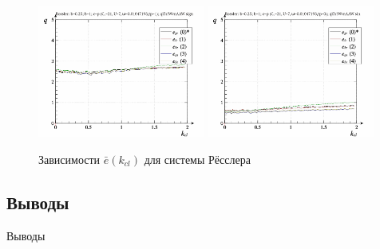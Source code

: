 \begin{figure}[ht!]
\begin{center}
  \includegraphics[width=0.49\textwidth]{p/cha/ross/ross_id-p_k_cl_ql3rlWvnAAW_sign.png}
  \hfill
  \includegraphics[width=0.49\textwidth]{p/cha/ross/ross_id-p_k_cl_ql3rlWvnAAW_sin.png}
\end{center}
  \caption{Зависимости $\bar{e}(k_{cl})$ для системы Рёсслера}
\label{atu:f:ross_e_k_cl}
\end{figure}






\subsection{Выводы}  %

Выводы




